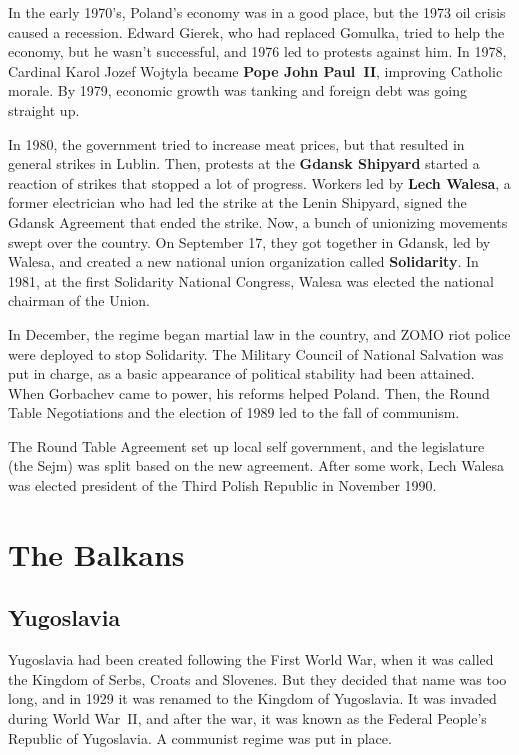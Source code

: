 In the early 1970's, Poland's economy was in a good place, but the 1973 oil crisis caused a recession.
Edward Gierek, who had replaced Gomulka, tried to help the economy, but he wasn't successful,
and 1976 led to protests against him.
In 1978, Cardinal Karol Jozef Wojtyla became \textbf{Pope John Paul~II}, improving Catholic morale.
By 1979, economic growth was tanking and foreign debt was going straight up.

In 1980, the government tried to increase meat prices, but that resulted in general strikes in Lublin.
Then, protests at the \textbf{Gdansk Shipyard} started a reaction of strikes that stopped a lot of progress.
Workers led by \textbf{Lech Walesa}, a former electrician who had led the strike at the Lenin Shipyard,
signed the Gdansk Agreement that ended the strike.
Now, a bunch of unionizing movements swept over the country.
On September 17, they got together in Gdansk, led by Walesa,
and created a new national union organization called \textbf{Solidarity}.
In 1981, at the first Solidarity National Congress, Walesa was elected the national chairman of the Union.

In December, the regime began martial law in the country, and ZOMO riot police were deployed to stop Solidarity.
The Military Council of National Salvation was put in charge,
as a basic appearance of political stability had been attained.
When Gorbachev came to power, his reforms helped Poland.
Then, the Round Table Negotiations and the election of 1989 led to the fall of communism.

The Round Table Agreement set up local self government,
and the legislature (the Sejm) was split based on the new agreement.
After some work, Lech Walesa was elected president of the Third Polish Republic in November 1990.

\section{The Balkans}

\subsection*{Yugoslavia}

Yugoslavia had been created following the First World War,
when it was called the Kingdom of Serbs, Croats and Slovenes.
But they decided that name was too long, and in 1929 it was renamed to the Kingdom of Yugoslavia.
It was invaded during World War~II, and after the war, it was known as the Federal People's Republic of Yugoslavia.
A communist regime was put in place.

